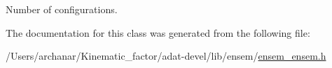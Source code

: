 Number of configurations. 



The documentation for this class was generated from the following file\+:\begin{DoxyCompactItemize}
\item 
/\+Users/archanar/\+Kinematic\+\_\+factor/adat-\/devel/lib/ensem/\mbox{\hyperlink{adat-devel_2lib_2ensem_2ensem__ensem_8h}{ensem\+\_\+ensem.\+h}}\end{DoxyCompactItemize}
